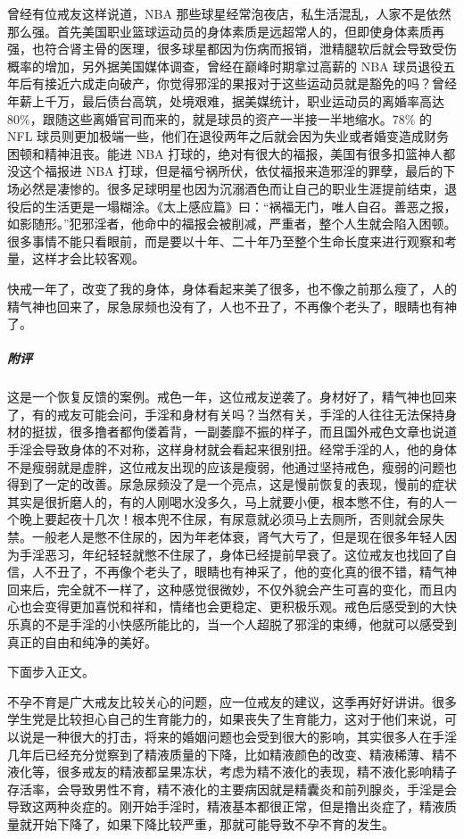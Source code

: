 \begin{case}
    曾经有位戒友这样说道，NBA 那些球星经常泡夜店，私生活混乱，人家不是依然那么强。首先美国职业篮球运动员的身体素质是远超常人的，但即使身体素质再强，也符合肾主骨的医理，很多球星都因为伤病而报销，泄精腿软后就会导致受伤概率的增加，另外据美国媒体调查，曾经在巅峰时期拿过高薪的 NBA 球员退役五年后有接近六成走向破产，你觉得邪淫的果报对于这些运动员就是豁免的吗？曾经年薪上千万，最后债台高筑，处境艰难，据美媒统计，职业运动员的离婚率高达 80\%，跟随这些离婚官司而来的，就是球员的资产一半接一半地缩水。78\% 的 NFL 球员则更加极端一些，他们在退役两年之后就会因为失业或者婚变造成财务困顿和精神沮丧。能进 NBA 打球的，绝对有很大的福报，美国有很多扣篮神人都没这个福报进 NBA 打球，但是福兮祸所伏，依仗福报来造邪淫的罪孽，最后的下场必然是凄惨的。很多足球明星也因为沉溺酒色而让自己的职业生涯提前结束，退役后的生活更是一塌糊涂。《太上感应篇》曰：“祸福无门，唯人自召。善恶之报，如影随形。”犯邪淫者，他命中的福报会被削减，严重者，整个人生就会陷入困顿。很多事情不能只看眼前，而是要以十年、二十年乃至整个生命长度来进行观察和考量，这样才会比较客观。
\end{case}

\begin{case}
    快戒一年了，改变了我的身体，身体看起来美了很多，也不像之前那么瘦了，人的精气神也回来了，尿急尿频也没有了，人也不丑了，不再像个老头了，眼睛也有神了。
    \subparagraph{附评} 这是一个恢复反馈的案例。戒色一年，这位戒友逆袭了。身材好了，精气神也回来了，有的戒友可能会问，手淫和身材有关吗？当然有关，手淫的人往往无法保持身材的挺拔，很多撸者都佝偻着背，一副萎靡不振的样子，而且国外戒色文章也说道手淫会导致身体的不对称，这样身材就会看起来很别扭。经常手淫的人，他的身体不是瘦弱就是虚胖，这位戒友出现的应该是瘦弱，他通过坚持戒色，瘦弱的问题也得到了一定的改善。尿急尿频没了是一个亮点，这是慢前恢复的表现，慢前的症状其实是很折磨人的，有的人刚喝水没多久，马上就要小便，根本憋不住，有的人一个晚上要起夜十几次！根本兜不住尿，有尿意就必须马上去厕所，否则就会尿失禁。一般老人是憋不住尿的，因为年老体衰，肾气大亏了，但是现在很多年轻人因为手淫恶习，年纪轻轻就憋不住尿了，身体已经提前早衰了。这位戒友也找回了自信，人不丑了，不再像个老头了，眼睛也有神采了，他的变化真的很不错，精气神回来后，完全就不一样了，这种感觉很微妙，不仅外貌会产生可喜的变化，而且内心也会变得更加喜悦和祥和，情绪也会更稳定、更积极乐观。戒色后感受到的大快乐真的不是手淫的小快感所能比的，当一个人超脱了邪淫的束缚，他就可以感受到真正的自由和纯净的美好。
\end{case}

下面步入正文。

不孕不育是广大戒友比较关心的问题，应一位戒友的建议，这季再好好讲讲。很多学生党是比较担心自己的生育能力的，如果丧失了生育能力，这对于他们来说，可以说是一种很大的打击，将来的婚姻问题也会受到很大的影响，其实很多人在手淫几年后已经充分觉察到了精液质量的下降，比如精液颜色的改变、精液稀薄、精不液化等，很多戒友的精液都呈果冻状，考虑为精不液化的表现，精不液化影响精子存活率，会导致男性不育，精不液化的主要病因就是精囊炎和前列腺炎，手淫是会导致这两种炎症的。刚开始手淫时，精液基本都很正常，但是撸出炎症了，精液质量就开始下降了，如果下降比较严重，那就可能导致不孕不育的发生。

